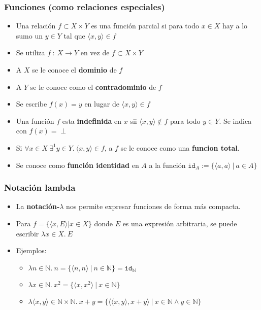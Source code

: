 \documentclass{beamer}
\begin{document}
\begin{frame}
\frametitle{Funciones (como relaciones especiales)}
\begin{itemize}
    \item{Una relaci\'on $f\subset X\times Y$ es una funci\'on parcial
    si para todo $x\in X$ hay a lo sumo un $y\in Y$ tal que $\langle x,y \rangle \in f$}
    \item{Se utiliza $f\ :\ X\rightarrow Y$ en vez de $f\subset X\times Y$}
    \item{A $X$ se le conoce el {\bf dominio} de $f$}
    \item{A $Y$ se le conoce como el {\bf contradominio} de $f$}
    \item{Se escribe $f(x)=y$ en lugar de $\langle x,y \rangle \in f$}
    \item{Una funci\'on $f$ esta {\bf indefinida} en $x$ sii $\langle x,y \rangle \notin f$
    para todo $y \in Y$. Se indica con $f(x)=\perp $}
    \item{Si $\forall x\in X\ \exists^1 y\in Y.\ \langle x, y\rangle \in f$, a
    $f$ se le conoce como una {\bf funcion total}.}
    \item{Se conoce como {\bf funci\'on identidad} en $A$ a la
    funci\'on $\mathtt{id}_{A}:=\{ \langle a,a \rangle\ |\ a\in A \}$}

\end{itemize}
\end{frame}

\begin{frame}
\frametitle{Notaci\'on lambda}
\begin{itemize}
    \item{La {\bf notaci\'on-$\lambda$} nos permite expresar funciones
    de forma m\'as compacta.}
    \item{Para $f=\{\langle x,E \rangle|x\in X\}$ donde $E$ es una expresi\'on
    arbitraria, se puede escribir $\lambda x\in X.\ E$}
    \item{Ejemplos:
    \begin{itemize}
        \item{$\lambda n\in \mathbb{N}.\ n=\{\langle n,n \rangle\ |\ n\in\mathbb{N} \}=\mathtt{id}_{\mathbb{N}}$}
        \item{$\lambda x\in \mathbb{N}.\ x^2=\{\langle x,x^2 \rangle\ |\ x\in\mathbb{N}\}$}
        \item{$\lambda \langle x,y \rangle \in \mathbb{N}\times \mathbb{N}.\ x+y=\{ \langle \langle x,y \rangle, x+y \rangle
        \ |\ x\in\mathbb{N}\wedge y\in\mathbb{N}\}$}
    \end{itemize}}
\end{itemize}
\end{frame}
\end{document}
